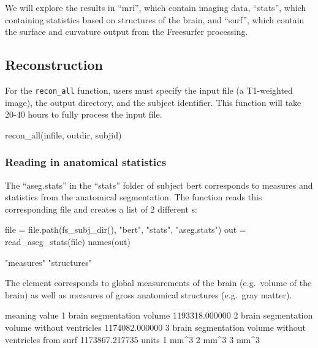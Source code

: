 We will explore the results in ``mri'', which contain imaging data,
``stats'', which containing statistics based on structures of the brain,
and ``surf'', which contain the surface and curvature output from the
Freesurfer processing.

\subsection{Reconstruction}\label{reconstruction}

For the \texttt{recon\_all} function, users must specify the input file
(a T1-weighted image), the output directory, and the subject identifier.
This function will take 20-40 hours to fully process the input file.

\begin{Schunk}
\begin{Sinput}
recon_all(infile, outdir, subjid)
\end{Sinput}
\end{Schunk}

\subsubsection{Reading in anatomical
statistics}\label{reading-in-anatomical-statistics}

The ``aseg.stats'' in the ``stats'' folder of subject bert corresponds
to measures and statistics from the anatomical segmentation. The
 function reads this corresponding file and
creates a list of 2 different s:

\begin{Schunk}
\begin{Sinput}
file = file.path(fs_subj_dir(), "bert", "stats", "aseg.stats")
out = read_aseg_stats(file)
names(out)
\end{Sinput}
\begin{Soutput}
[1] "measures"   "structures"
\end{Soutput}
\end{Schunk}

The  element corresponds to global measurements of the
brain (e.g.~volume of the brain) as well as measures of gross anatomical
structures (e.g.~gray matter).

\begin{Schunk}
\begin{Soutput}
                                                 meaning          value
1                              brain segmentation volume 1193318.000000
2           brain segmentation volume without ventricles 1174082.000000
3 brain segmentation volume without ventricles from surf 1173867.217735
  units
1  mm^3
2  mm^3
3  mm^3
\end{Soutput}
\end{Schunk}

